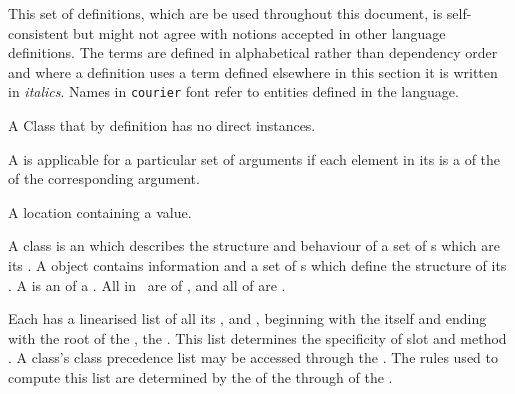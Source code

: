 \begin{optPrivate}
\end{optPrivate}
\begin{optDefinition}
\label{sec:definitions}
This set of definitions, which are be used throughout this document, is
self-consistent but might not agree with notions accepted in other language
definitions.  The terms are defined in alphabetical rather than dependency order
and where a definition uses a term defined elsewhere in this section it is
written in {\em italics}.  Names in {\tt courier} font refer to entities defined
in the language.
%
\begin{definitions}
    A Class that by definition has no direct instances.

     
      A  is applicable for a
    particular set of arguments if each element in its  is a
     of the  of the corresponding argument.

    A location containing a value.

     A class is an  which
    describes the structure and behaviour of a set of s which are
    its .  A  object contains 
    information and a set of  s which define the
    structure of its .  A   is an
     of a .  All  in \eulisp\ are
     of {}, and all  of
    {} are .

     
    Each  has a linearised list of all its ,
     and , beginning with the  itself and
    ending with the root of the  , the 
    .  This list determines the specificity of slot and method
    .  A class's class precedence list may be accessed through
    the  . The rules used to
    compute this list are determined by the  of the  through
     of the 
    .


\end{definitions}
\end{optDefinition}

